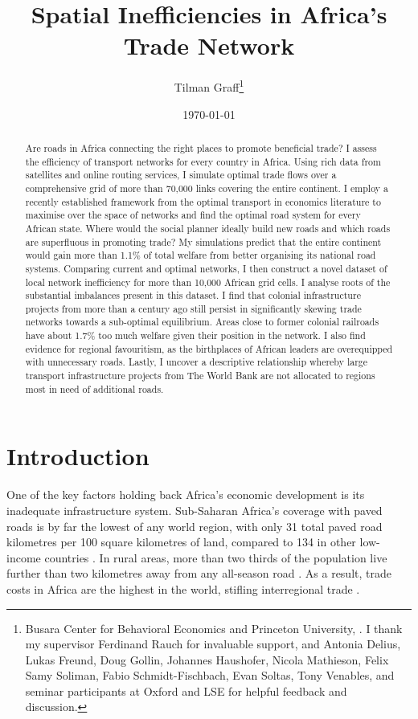 \documentclass[11pt, oneside]{article}   	%
\title{Spatial Inefficiencies in Africa's Trade Network}
\author{Tilman Graff\thanks{Busara Center for Behavioral Economics and Princeton University, \href{mailto:tgraff@princeton.edu}{\UrlFont{tgraff@princeton.edu}}. I thank my supervisor Ferdinand Rauch for invaluable support, and Antonia Delius, Lukas Freund, Doug Gollin, Johannes Haushofer, Nicola Mathieson, Felix Samy Soliman, Fabio Schmidt-Fischbach, Evan Soltas, Tony Venables, and seminar participants at Oxford and LSE for helpful feedback and discussion.}}
\date{\today}
\begin{document}


\maketitle

\begin{abstract}
  Are roads in Africa connecting the right places to promote beneficial trade? I assess the efficiency of transport networks for every country in Africa. Using rich data from satellites and online routing services, I simulate optimal trade flows over a comprehensive grid of more than 70,000 links covering the entire continent. I employ a recently established framework from the optimal transport in economics literature to maximise over the space of networks and find the optimal road system for every African state. Where would the social planner ideally build new roads and which roads are superfluous in promoting trade? My simulations predict that the entire continent would gain more than 1.1\% of total welfare from better organising its national road systems. Comparing current and optimal networks, I then construct a novel dataset of local network inefficiency for more than 10,000 African grid cells. I analyse roots of the substantial imbalances present in this dataset. I find that colonial infrastructure projects from more than a century ago still persist in significantly skewing trade networks towards a sub-optimal equilibrium. Areas close to former colonial railroads have about 1.7\% too much welfare given their position in the network. I also find evidence for regional favouritism, as the birthplaces of African leaders are overequipped with unnecessary roads. Lastly, I uncover a descriptive relationship whereby large transport infrastructure projects from The World Bank are not allocated to regions most in need of additional roads.
\end{abstract}

\newpage



\section{Introduction}
One of the key factors holding back Africa's economic development is its inadequate infrastructure system. Sub-Saharan Africa's coverage with paved roads is by far the lowest of any world region, with only 31 total paved road kilometres per 100 square kilometres of land, compared to 134 in other low-income countries \citep{Foster_AfricaInfrastructureTime_2010}. In rural areas, more than two thirds of the population live further than two kilometres away from any all-season road \citep{Teravaninthorn_TransportPricesCosts_2009}. As a result, trade costs in Africa are the highest in the world, stifling interregional trade \citep{Limao_InfrastructureGeographicalDisadvantage_2001,Foster_AfricaInfrastructureTime_2010,TheEconomist_All_2015}.
\end{document}
